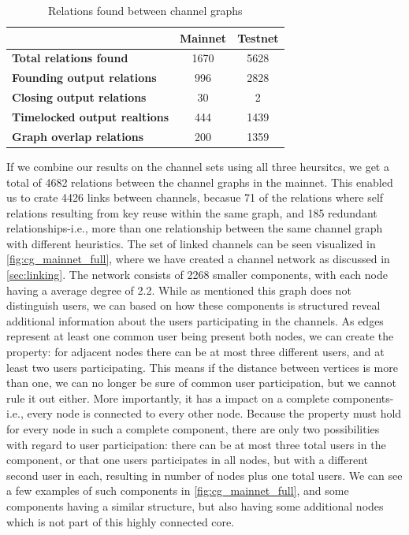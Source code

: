 \begin{table}[ht]
\centering
\caption{Relations found between channel graphs}
\label{table:connections}
\begin{tabular}{|l|c|c|}
\hline
                                       & \textbf{Mainnet} & \textbf{Testnet} \\ \hline
\textbf{Total relations found}       & 1670            & 5628             \\ \hline
\textbf{Founding output relations}   & 996               & 2828             \\ \hline
\textbf{Closing output relations}    & 30              & 2                \\ \hline
\textbf{Timelocked output realtions} & 444               & 1439             \\ \hline
\textbf{Graph overlap relations}     & 200               & 1359             \\ \hline
\end{tabular}
\end{table}

If we combine our results on the channel sets using all three heursitcs, we get a total of 4682 relations between the channel graphs in the mainnet. This enabled us to crate 4426 links between channels, becasue 71 of the relations where self relations resulting from key reuse within the same graph, and 185 redundant relationships-i.e., more than one relationship between the same channel graph with different heuristics. The set of linked channels can be seen visualized in \cref{fig:cg_mainnet_full}, where we have created a channel network as discussed in \cref{sec:linking}. The network consists of 2268 smaller components, with each node having a average degree of 2.2. While as mentioned this graph does not distinguish users, we can based on how these components is structured reveal additional information about the users participating in the channels. 
As edges represent at least one common user being present both nodes, we can create the property: for adjacent nodes there can be at most three different users, and at least two users participating. This means if the distance between vertices is more than one, we can no longer be sure of common user participation, but we cannot rule it out either. More importantly, it has a impact on a complete components-i.e., every node is connected to every other node. Because the property must hold for every node in such a complete component, there are only two possibilities with regard to user participation: there can be at most three total users in the component, or that one users participates in all nodes, but with a different second user in each, resulting in number of nodes plus one total users.
We can see a few examples of such components in \cref{fig:cg_mainnet_full}, and some components having a similar structure, but also having some additional nodes which is not part of this highly connected core.
\\

